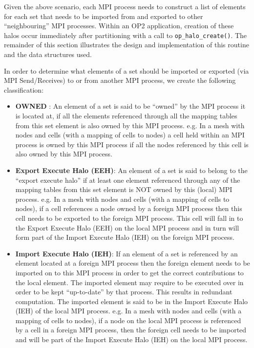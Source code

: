 \documentclass[12pt]{article}
\begin{document}
Given the above scenario, each MPI process needs to construct a list of elements for each set that needs to be
imported from and exported to other ``neighbouring'' MPI processes. Within an OP2 application, creation of these
halos occur immediately after partitioning with a call to \texttt{op\_halo\_create()}. The remainder of this section
illustrates the design and implementation of this routine and the data structures used. 

\noindent In order to determine what elements of a set should be imported or exported (via MPI Send/Receives) to or from
another MPI process, we create the following classification:
\begin{itemize}
\item \textbf{OWNED} : An element of a set is said to be ``owned'' by the MPI process it is located at, if all the
elements referenced through all the mapping tables from this set element is also owned by this MPI process. e.g. In a
mesh with nodes and cells (with a mapping of cells to nodes) a cell held within an MPI process is owned by this MPI
process if all the nodes referenced by this cell is also owned by this MPI process. 

\item \textbf{Export Execute Halo (EEH)}: An element of a set is said to belong to the ``export execute halo'' if at
least one element referenced through any of the mapping tables from this set element is NOT owned by this (local) MPI
process. e.g. In a mesh with nodes and cells (with a mapping of cells to nodes), if a cell references a node owned by a
foreign MPI process then this cell needs to be exported to the foreign MPI process. This cell will fall in to the Export
Execute Halo (EEH) on the local MPI process and in turn will form part of the Import Execute Halo (IEH) on the foreign
MPI process.

\item \textbf{Import Execute Halo (IEH)}: If an element of a set is referenced by an element located at a foreign MPI
process then the foreign element needs to be imported on to this MPI process in order to get the correct contributions
to the local element. The imported element may require to be executed over in order to be kept ``up-to-date'' by that
process. This results in redundant computation. The imported element is said to be in the Import Execute Halo (IEH) of
the local MPI process. e.g. In a mesh with nodes and cells (with a mapping of cells to nodes), if a node on the local
MPI process is referenced by a cell in a foreign MPI process, then the foreign cell needs to be imported and will be
part of the Import Execute Halo (IEH) on the local MPI process. 


\end{itemize}
\end{document}
